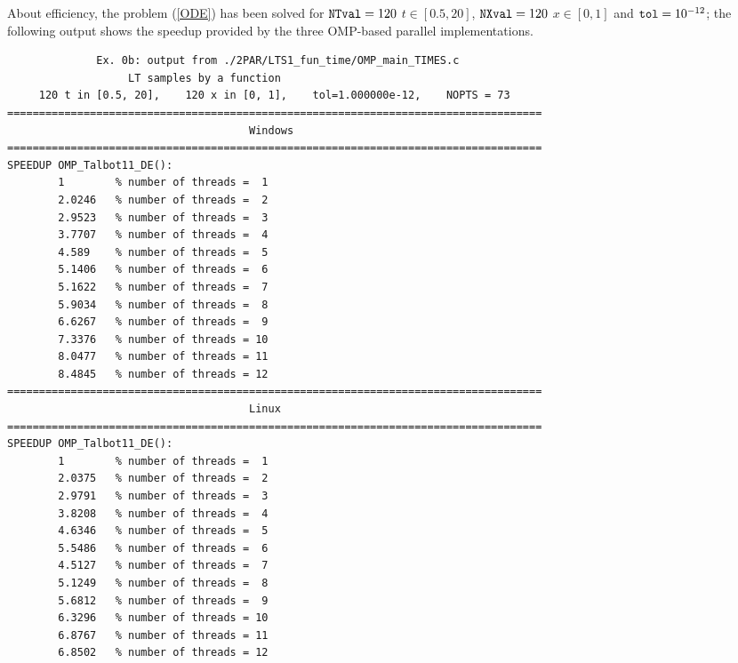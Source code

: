 \documentclass[a4paper,10pt]{report}%
\begin{document}
About efficiency, the problem (\ref{ODE}) has been solved for ${\tt NTval}=120$ $t\in[0.5,20]$, ${\tt NXval}=120$
$x\in[0,1]$ and ${\tt tol}=10^{-12}$; the following output shows the speedup provided by the three OMP-based parallel
implementations.
\begin{lstlisting}
              Ex. 0b: output from ./2PAR/LTS1_fun_time/OMP_main_TIMES.c
                   LT samples by a function
     120 t in [0.5, 20],    120 x in [0, 1],    tol=1.000000e-12,    NOPTS = 73
====================================================================================
                                      Windows
====================================================================================
SPEEDUP OMP_Talbot11_DE():
        1        % number of threads =  1
        2.0246   % number of threads =  2
        2.9523   % number of threads =  3
        3.7707   % number of threads =  4
        4.589    % number of threads =  5
        5.1406   % number of threads =  6
        5.1622   % number of threads =  7
        5.9034   % number of threads =  8
        6.6267   % number of threads =  9
        7.3376   % number of threads = 10
        8.0477   % number of threads = 11
        8.4845   % number of threads = 12
====================================================================================
                                      Linux
====================================================================================
SPEEDUP OMP_Talbot11_DE():
        1        % number of threads =  1
        2.0375   % number of threads =  2
        2.9791   % number of threads =  3
        3.8208   % number of threads =  4
        4.6346   % number of threads =  5
        5.5486   % number of threads =  6
        4.5127   % number of threads =  7
        5.1249   % number of threads =  8
        5.6812   % number of threads =  9
        6.3296   % number of threads = 10
        6.8767   % number of threads = 11
        6.8502   % number of threads = 12


\end{lstlisting}
\end{document}
